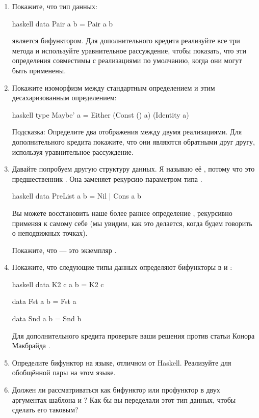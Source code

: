 \begin{enumerate}
  \tightlist
  \item
        Покажите, что тип данных:

        \begin{snip}{haskell}
data Pair a b = Pair a b
\end{snip}

        является бифунктором. Для дополнительного кредита реализуйте все три метода
         и используйте уравнительное рассуждение, чтобы показать, что эти
        определения совместимы с реализациями по умолчанию, когда
        они могут быть применены.
  \item
        Покажите изоморфизм между стандартным определением 
        и этим десахаризованным определением:

        \begin{snip}{haskell}
type Maybe' a = Either (Const () a) (Identity a)
\end{snip}

        Подсказка: Определите два отображения между двумя реализациями. Для
        дополнительного кредита покажите, что они являются обратными друг другу, используя
        уравнительное рассуждение.
  \item
        Давайте попробуем другую структуру данных. Я называю её , потому что
        это предшественник . Она заменяет рекурсию параметром типа
        .

        \begin{snip}{haskell}
data PreList a b = Nil | Cons a b
\end{snip}

        Вы можете восстановить наше более раннее определение ,
        рекурсивно применяя  к самому себе (мы увидим, как это
        делается, когда будем говорить о неподвижных точках).

        Покажите, что  --- это экземпляр .
  \item
        Покажите, что следующие типы данных определяют бифункторы в  и
        :

        \begin{snip}{haskell}
data K2 c a b = K2 c

data Fst a b = Fst a

data Snd a b = Snd b
\end{snip}

        Для дополнительного кредита проверьте ваши решения против статьи Конора Макбрайда
        .
  \item
        Определите бифунктор на языке, отличном от Haskell. Реализуйте
         для обобщённой пары на этом языке.
  \item
        Должен ли  рассматриваться как бифунктор или профунктор в
        двух аргументах шаблона  и ? Как бы вы
        переделали этот тип данных, чтобы сделать его таковым?
\end{enumerate}
